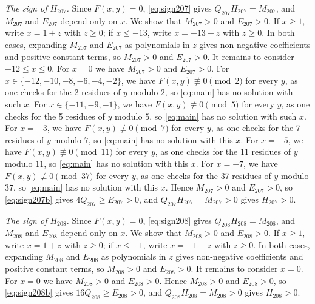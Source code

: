 \documentclass[11pt]{article}
\begin{document}
\emph{The sign of $H_{207}$.} Since $F(x,y)=0$, \eqref{eq:sign207} gives $Q_{207}H_{207}=M_{207}$, and $M_{207}$ and $E_{207}$ depend only on $x$. We show that $M_{207}>0$ and $E_{207}>0$. If $x\geq1$, write $x=1+z$ with $z\geq0$; if $x\leq-13$, write $x=-13-z$ with $z\geq0$. In both cases, expanding $M_{207}$ and $E_{207}$ as polynomials in $z$ gives non-negative coefficients and positive constant terms, so $M_{207}>0$ and $E_{207}>0$. It remains to consider $-12\leq x\leq0$. For $x=0$ we have $M_{207}>0$ and $E_{207}>0$. For $x\in\{-12,\allowbreak -10,\allowbreak -8,\allowbreak -6,\allowbreak -4,\allowbreak -2\}$, we have $F(x,y)\not\equiv0\pmod{2}$ for every $y$, as one checks for the 2 residues of $y$ modulo $2$, so \eqref{eq:main} has no solution with such $x$. For $x\in\{-11,\allowbreak -9,\allowbreak -1\}$, we have $F(x,y)\not\equiv0\pmod{5}$ for every $y$, as one checks for the 5 residues of $y$ modulo $5$, so \eqref{eq:main} has no solution with such $x$. For $x=-3$, we have $F(x,y)\not\equiv0\pmod{7}$ for every $y$, as one checks for the 7 residues of $y$ modulo $7$, so \eqref{eq:main} has no solution with this $x$. For $x=-5$, we have $F(x,y)\not\equiv0\pmod{11}$ for every $y$, as one checks for the 11 residues of $y$ modulo $11$, so \eqref{eq:main} has no solution with this $x$. For $x=-7$, we have $F(x,y)\not\equiv0\pmod{37}$ for every $y$, as one checks for the 37 residues of $y$ modulo $37$, so \eqref{eq:main} has no solution with this $x$. Hence $M_{207}>0$ and $E_{207}>0$, so \eqref{eq:sign207b} gives $4Q_{207}\geq E_{207}>0$, and $Q_{207}H_{207}=M_{207}>0$ gives $H_{207}>0$.

\emph{The sign of $H_{208}$.} Since $F(x,y)=0$, \eqref{eq:sign208} gives $Q_{208}H_{208}=M_{208}$, and $M_{208}$ and $E_{208}$ depend only on $x$. We show that $M_{208}>0$ and $E_{208}>0$. If $x\geq1$, write $x=1+z$ with $z\geq0$; if $x\leq-1$, write $x=-1-z$ with $z\geq0$. In both cases, expanding $M_{208}$ and $E_{208}$ as polynomials in $z$ gives non-negative coefficients and positive constant terms, so $M_{208}>0$ and $E_{208}>0$. It remains to consider $x=0$. For $x=0$ we have $M_{208}>0$ and $E_{208}>0$. Hence $M_{208}>0$ and $E_{208}>0$, so \eqref{eq:sign208b} gives $16Q_{208}\geq E_{208}>0$, and $Q_{208}H_{208}=M_{208}>0$ gives $H_{208}>0$.
\end{document}
